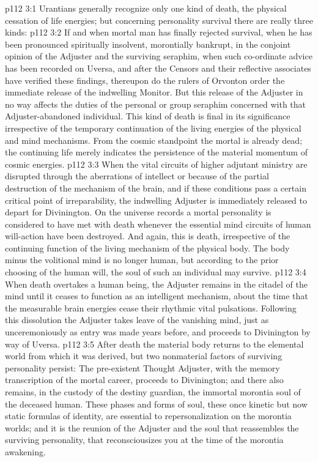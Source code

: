 \vs p112 3:1 Urantians generally recognize only one kind of death, the physical cessation of life energies; but concerning personality survival there are really three kinds:
\pc \vs p112 3:2 \bibnobreakspace {} If and when mortal man has finally rejected survival, when he has been pronounced spiritually insolvent, morontially bankrupt, in the conjoint opinion of the Adjuster and the surviving seraphim, when such co\hyp{}ordinate advice has been recorded on Uversa, and after the Censors and their reflective associates have verified these findings, thereupon do the rulers of Orvonton order the immediate release of the indwelling Monitor. But this release of the Adjuster in no way affects the duties of the personal or group seraphim concerned with that Adjuster\hyp{}abandoned individual. This kind of death is final in its significance irrespective of the temporary continuation of the living energies of the physical and mind mechanisms. From the cosmic standpoint the mortal is already dead; the continuing life merely indicates the persistence of the material momentum of cosmic energies.
\pc \vs p112 3:3 \bibnobreakspace {} When the vital circuits of higher adjutant ministry are disrupted through the aberrations of intellect or because of the partial destruction of the mechanism of the brain, and if these conditions pass a certain critical point of irreparability, the indwelling Adjuster is immediately released to depart for Divinington. On the universe records a mortal personality is considered to have met with death whenever the essential mind circuits of human will\hyp{}action have been destroyed. And again, this is death, irrespective of the continuing function of the living mechanism of the physical body. The body minus the volitional mind is no longer human, but according to the prior choosing of the human will, the soul of such an individual may survive.
\pc \vs p112 3:4 \bibnobreakspace {} When death overtakes a human being, the Adjuster remains in the citadel of the mind until it ceases to function as an intelligent mechanism, about the time that the measurable brain energies cease their rhythmic vital pulsations. Following this dissolution the Adjuster takes leave of the vanishing mind, just as unceremoniously as entry was made years before, and proceeds to Divinington by way of Uversa.
\pc \vs p112 3:5 After death the material body returns to the elemental world from which it was derived, but two nonmaterial factors of surviving personality persist: The pre\hyp{}existent Thought Adjuster, with the memory transcription of the mortal career, proceeds to Divinington; and there also remains, in the custody of the destiny guardian, the immortal morontia soul of the deceased human. These phases and forms of soul, these once kinetic but now static formulas of identity, are essential to repersonalization on the morontia worlds; and it is the reunion of the Adjuster and the soul that reassembles the surviving personality, that reconsciousizes you at the time of the morontia awakening.\plusone
